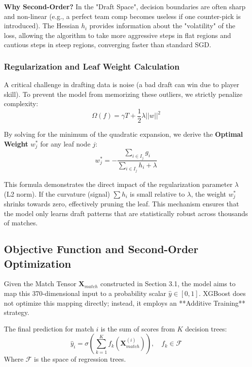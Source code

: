 \documentclass[12pt, a4paper]{article}
\begin{document}
    \textbf{Why Second-Order?} In the "Draft Space", decision boundaries are often sharp and non-linear (e.g., a perfect team comp becomes useless if one counter-pick is introduced). The Hessian $h_i$ provides information about the "volatility" of the loss, allowing the algorithm to take more aggressive steps in flat regions and cautious steps in steep regions, converging faster than standard SGD.

    \subsubsection{Regularization and Leaf Weight Calculation}
    A critical challenge in drafting data is noise (a bad draft can win due to player skill). To prevent the model from memorizing these outliers, we strictly penalize complexity:
    \begin{equation}
        \Omega(f) = \gamma T + \frac{1}{2}\lambda ||w||^2
    \end{equation}

    By solving for the minimum of the quadratic expansion, we derive the \textbf{Optimal Weight} $w_j^*$ for any leaf node $j$:
    \begin{equation}
        w_j^* = - \frac{\sum_{i \in I_j} g_i}{\sum_{i \in I_j} h_i + \lambda}
    \end{equation}

    This formula demonstrates the direct impact of the regularization parameter $\lambda$ (L2 norm). If the curvature (signal) $\sum h_i$ is small relative to $\lambda$, the weight $w_j^*$ shrinks towards zero, effectively pruning the leaf. This mechanism ensures that the model only learns draft patterns that are statistically robust across thousands of matches.

    \subsection{Objective Function and Second-Order Optimization}

    Given the Match Tensor $\mathbf{X}_{match}$ constructed in Section 3.1, the model aims to map this 370-dimensional input to a probability scalar $\hat{y} \in [0,1]$. XGBoost does not optimize this mapping directly; instead, it employs an **Additive Training** strategy.

    The final prediction for match $i$ is the sum of scores from $K$ decision trees:
    \begin{equation}
        \hat{y}_i = \sigma \left( \sum_{k=1}^K f_k(\mathbf{X}_{match}^{(i)}) \right), \quad f_k \in \mathcal{F}
    \end{equation}
    Where $\mathcal{F}$ is the space of regression trees.
\end{document}
